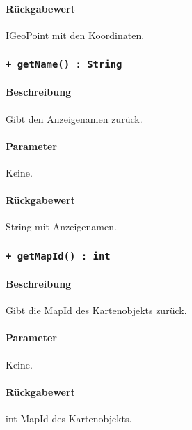 \paragraph*{Rückgabewert}
IGeoPoint mit den Koordinaten.

\subsubsection{\texttt{+ getName() : String}}%
\paragraph*{Beschreibung}
Gibt den Anzeigenamen zurück.
\paragraph*{Parameter}
Keine.
\paragraph*{Rückgabewert}
String mit Anzeigenamen.

\subsubsection{\texttt{+ getMapId() : int}}%
\paragraph*{Beschreibung}
Gibt die MapId des Kartenobjekts zurück.
\paragraph*{Parameter}
Keine.
\paragraph*{Rückgabewert}
int MapId des Kartenobjekts.